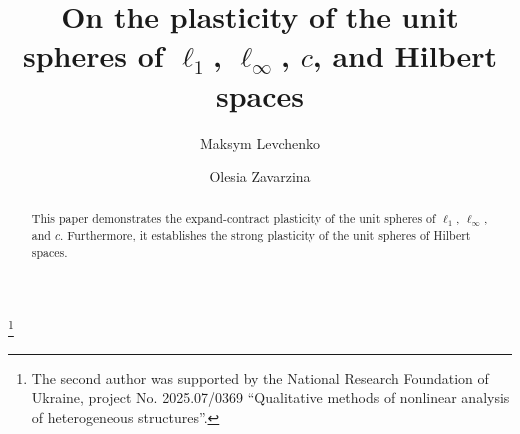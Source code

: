 \documentclass[reqno]{amsart}
\theoremstyle{plain}
\theoremstyle{remark}
\theoremstyle{definition}
\begin{document}
\title[ Plasticity of the unit spheres]{On the plasticity of the unit spheres of $\ell_1$, $\ell_{\infty}$, $c$, and Hilbert spaces}
\author[M.~Levchenko]{Maksym Levchenko}
\address{Department of Mathematics and Informatics, V. N. Karazin Kharkiv National
University, 61022 Kharkiv, Ukraine.}

\author[O.~Zavarzina]{Olesia Zavarzina}
\address{Department of Mathematics and Informatics, V. N. Karazin Kharkiv National
University, 61022 Kharkiv, Ukraine.}
\begin{abstract} 
This paper demonstrates the expand-contract plasticity of the unit spheres of $\ell_1$, $\ell_{\infty}$, and $c$. Furthermore, it establishes the strong plasticity of the unit spheres of Hilbert spaces.

\end{abstract}
\thanks{ The second author was supported  by the National Research Foundation of Ukraine, project No. 2025.07/0369 ``Qualitative methods of nonlinear analysis of heterogeneous structures''.}
\maketitle
\end{document}

